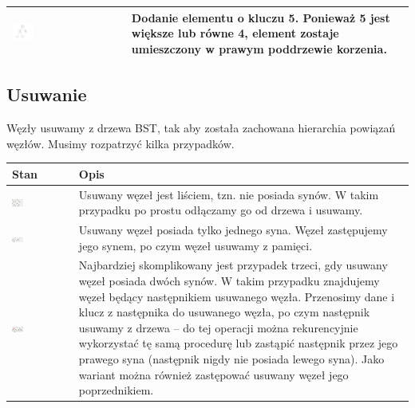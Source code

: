 \documentclass{article}
\begin{document}
\begin{tabular}{|>{\centering\arraybackslash}m{}|>{\centering\arraybackslash}m{}|}
    \hline
    \href{https://i.imgur.com/aRC3aUB.png}{\includegraphics[width=0.2\textwidth]{"../assets/3_5.png"}} & Dodanie elementu o kluczu 5. Ponieważ 5 jest większe lub równe 4, element zostaje umieszczony w prawym poddrzewie korzenia. \\
    \hline
    \end{tabular}

\subsection*{Usuwanie}
Węzły usuwamy z drzewa BST, tak aby została zachowana hierarchia powiązań węzłów. Musimy rozpatrzyć kilka przypadków.

\begin{tabular}{|>{\centering\arraybackslash}m{}|>{\centering\arraybackslash}m{}|}
    \hline
    \textbf{Stan} & \textbf{Opis} \\
    \hline
    \href{https://i.imgur.com/MiukhDU.png}{\includegraphics[width=0.2\textwidth]{"../assets/2_1.png"}} & Usuwany węzeł jest liściem, tzn. nie posiada synów. W takim przypadku po prostu odłączamy go od drzewa i usuwamy.    \\
    \hline
    \href{https://i.imgur.com/n1rgQ3G.png}{\includegraphics[width=0.2\textwidth]{"../assets/2_2.png"}} & Usuwany węzeł posiada tylko jednego syna. Węzeł zastępujemy jego synem, po czym węzeł usuwamy z pamięci.    \\
    \hline
    \href{https://i.imgur.com/IxPk8qc.png}{\includegraphics[width=0.2\textwidth]{"../assets/2_3.png"}} & Najbardziej skomplikowany jest przypadek trzeci, gdy usuwany węzeł posiada dwóch synów. W takim przypadku znajdujemy węzeł będący następnikiem usuwanego węzła. Przenosimy dane i klucz z następnika do usuwanego węzła, po czym następnik usuwamy z drzewa – do tej operacji można rekurencyjnie wykorzystać tę samą procedurę lub zastąpić następnik przez jego prawego syna (następnik nigdy nie posiada lewego syna). Jako wariant można również zastępować usuwany węzeł jego poprzednikiem. \\
    \hline
    \end{tabular}
\end{document}
